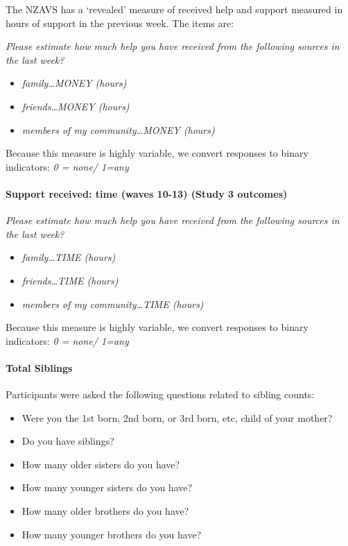 \documentclass[
  single column]{article}
\let\oldparagraph\paragraph
\renewcommand{\paragraph}[1]{\oldparagraph{#1}\mbox{}}
\providecommand{\tightlist}{%
  \setlength{\itemsep}{0pt}\setlength{\parskip}{0pt}}\usepackage{longtable,booktabs,array}
\begin{document}
The NZAVS has a `revealed' measure of received help and support measured
in hours of support in the previous week. The items are:

\emph{Please estimate how much help you have received from the following
sources in the last week?}

\begin{itemize}
\tightlist
\item
  \emph{family\ldots MONEY (hours)}
\item
  \emph{friends\ldots MONEY (hours)}
\item
  \emph{members of my community\ldots MONEY (hours)}
\end{itemize}

Because this measure is highly variable, we convert responses to binary
indicators: \emph{0 = none/ 1=any}

\paragraph{Support received: time (waves 10-13) (Study 3
outcomes)}\label{support-received-time-waves-10-13-study-3-outcomes}

\emph{Please estimate how much help you have received from the following
sources in the last week?}

\begin{itemize}
\tightlist
\item
  \emph{family\ldots TIME (hours)}
\item
  \emph{friends\ldots TIME (hours)}
\item
  \emph{members of my community\ldots TIME (hours)}
\end{itemize}

Because this measure is highly variable, we convert responses to binary
indicators: \emph{0 = none/ 1=any}

\paragraph{Total Siblings}\label{total-siblings}

Participants were asked the following questions related to sibling
counts:

\begin{itemize}
\tightlist
\item
  Were you the 1st born, 2nd born, or 3rd born, etc, child of your
  mother?
\item
  Do you have siblings?
\item
  How many older sisters do you have?
\item
  How many younger sisters do you have?
\item
  How many older brothers do you have?
\item
  How many younger brothers do you have?
\end{itemize}
\end{document}
